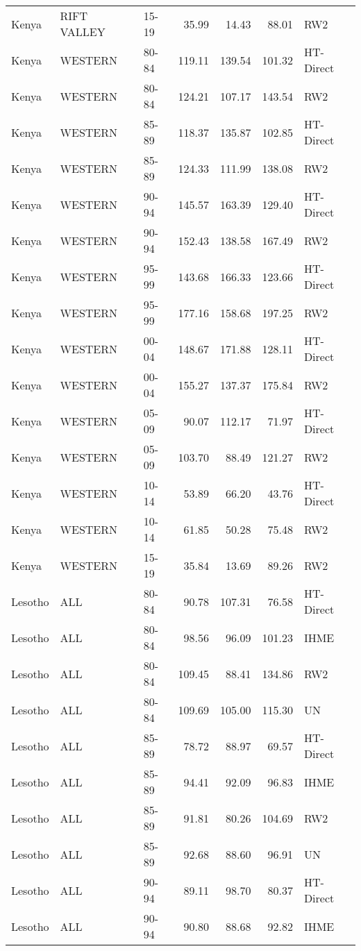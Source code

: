 \begin{longtable}{lllrrrl}
  Kenya & RIFT VALLEY & 15-19 & 35.99 & 14.43 & 88.01 & RW2 \\ 
  Kenya & WESTERN & 80-84 & 119.11 & 139.54 & 101.32 & HT-Direct \\ 
  Kenya & WESTERN & 80-84 & 124.21 & 107.17 & 143.54 & RW2 \\ 
  Kenya & WESTERN & 85-89 & 118.37 & 135.87 & 102.85 & HT-Direct \\ 
  Kenya & WESTERN & 85-89 & 124.33 & 111.99 & 138.08 & RW2 \\ 
  Kenya & WESTERN & 90-94 & 145.57 & 163.39 & 129.40 & HT-Direct \\ 
  Kenya & WESTERN & 90-94 & 152.43 & 138.58 & 167.49 & RW2 \\ 
  Kenya & WESTERN & 95-99 & 143.68 & 166.33 & 123.66 & HT-Direct \\ 
  Kenya & WESTERN & 95-99 & 177.16 & 158.68 & 197.25 & RW2 \\ 
  Kenya & WESTERN & 00-04 & 148.67 & 171.88 & 128.11 & HT-Direct \\ 
  Kenya & WESTERN & 00-04 & 155.27 & 137.37 & 175.84 & RW2 \\ 
  Kenya & WESTERN & 05-09 & 90.07 & 112.17 & 71.97 & HT-Direct \\ 
  Kenya & WESTERN & 05-09 & 103.70 & 88.49 & 121.27 & RW2 \\ 
  Kenya & WESTERN & 10-14 & 53.89 & 66.20 & 43.76 & HT-Direct \\ 
  Kenya & WESTERN & 10-14 & 61.85 & 50.28 & 75.48 & RW2 \\ 
  Kenya & WESTERN & 15-19 & 35.84 & 13.69 & 89.26 & RW2 \\ 
  Lesotho & ALL & 80-84 & 90.78 & 107.31 & 76.58 & HT-Direct \\ 
  Lesotho & ALL & 80-84 & 98.56 & 96.09 & 101.23 & IHME \\ 
  Lesotho & ALL & 80-84 & 109.45 & 88.41 & 134.86 & RW2 \\ 
  Lesotho & ALL & 80-84 & 109.69 & 105.00 & 115.30 & UN \\ 
  Lesotho & ALL & 85-89 & 78.72 & 88.97 & 69.57 & HT-Direct \\ 
  Lesotho & ALL & 85-89 & 94.41 & 92.09 & 96.83 & IHME \\ 
  Lesotho & ALL & 85-89 & 91.81 & 80.26 & 104.69 & RW2 \\ 
  Lesotho & ALL & 85-89 & 92.68 & 88.60 & 96.91 & UN \\ 
  Lesotho & ALL & 90-94 & 89.11 & 98.70 & 80.37 & HT-Direct \\ 
  Lesotho & ALL & 90-94 & 90.80 & 88.68 & 92.82 & IHME \\ 

\end{longtable}
